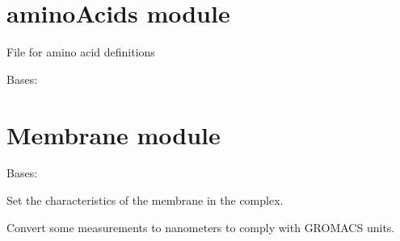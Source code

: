 \documentclass[letterpaper,10pt,english]{sphinxmanual}
\begin{document}
\sphinxstepscope


\section{aminoAcids module}
\label{\detokenize{aminoAcids:module-aminoAcids}}\label{\detokenize{aminoAcids:aminoacids-module}}\label{\detokenize{aminoAcids::doc}}
\sphinxAtStartPar
File for amino acid definitions

\begin{fulllineitems}
\label{\detokenize{aminoAcids:aminoAcids.AminoAcids}}
\pysigstartsignatures
{}
\pysigstopsignatures
\sphinxAtStartPar
Bases: 

\end{fulllineitems}


\sphinxstepscope


\section{Membrane module}
\label{\detokenize{membrane:module-membrane}}\label{\detokenize{membrane:membrane-module}}\label{\detokenize{membrane::doc}}

\begin{fulllineitems}
\label{\detokenize{membrane:membrane.Membrane}}
\pysigstartsignatures
{}
\pysigstopsignatures
\sphinxAtStartPar
Bases: 

\sphinxAtStartPar
Set the characteristics of the membrane in the complex.

\begin{fulllineitems}
\label{\detokenize{membrane:membrane.Membrane.set_nanom}}
\pysigstartsignatures
{}
\pysigstopsignatures
\sphinxAtStartPar
Convert some measurements to nanometers to comply with GROMACS units.

\end{fulllineitems}


\end{fulllineitems}
\end{document}
